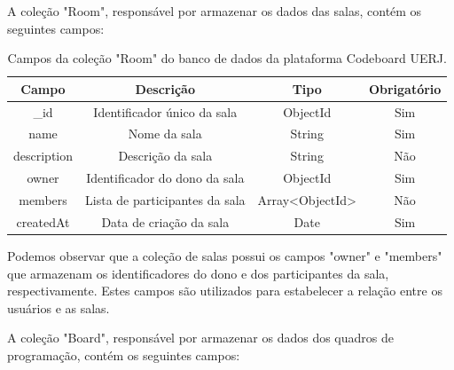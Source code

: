 A coleção "Room", responsável por armazenar os dados das salas, contém os seguintes campos:

\begin{table}[H]
    \centering
    \renewcommand{\arraystretch}{1.3} 
    \begin{tabular}{|c|c|c|c|}
        \hline
        \textbf{Campo} & \textbf{Descrição}             & \textbf{Tipo}   & \textbf{Obrigatório} \\
        \hline
        \_id           & Identificador único da sala    & ObjectId        & Sim                  \\
        \hline
        name           & Nome da sala                   & String          & Sim                  \\
        \hline
        description    & Descrição da sala              & String          & Não                  \\
        \hline
        owner          & Identificador do dono da sala  & ObjectId        & Sim                  \\
        \hline
        members        & Lista de participantes da sala & Array<ObjectId> & Não                  \\
        \hline
        createdAt      & Data de criação da sala        & Date            & Sim                  \\
        \hline
    \end{tabular}
    \caption{Campos da coleção "Room" do banco de dados da plataforma Codeboard UERJ.}
    \label{tab:room-collection-fields}
\end{table}


Podemos observar que a coleção de salas possui os campos "owner" e "members" que armazenam os identificadores do dono e dos participantes da sala, respectivamente. Estes campos são utilizados para estabelecer a relação entre os usuários e as salas.

A coleção "Board", responsável por armazenar os dados dos quadros de programação, contém os seguintes campos:

